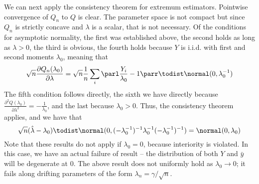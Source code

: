 \documentclass[10pt]{article}
\begin{document}
\begin{example}
	We can next apply the consistency theorem for extremum estimators. Pointwise convergence of $Q_n$ to $Q$ is clear. The parameter space is not compact but since $Q_n$ is strictly concave and $\lambda$ is a scalar, that is not necessary. Of the conditions for asymptotic normality, the first was established above, the second holds as long as $\lambda > 0$, the third is obvious, the fourth holds because $Y$ is i.i.d. with first and second moments $\lambda_0$, meaning that \[\sqrt{n}\frac{\partial Q_n(\lambda_0)}{\partial \lambda} = \sqrt{n}\frac{1}{n} \sum_i \parl \frac{Y_i}{\lambda_0}- 1\parr \todist \normal(0,\lambda_0^{-1})\]The fifth condition follows directly, the sixth we have directly because $\frac{\partial^2 Q(\lambda_0)}{\partial \lambda^2} = -\frac{1}{\lambda_0}$, and the last because $\lambda_0 > 0$. Thus, the consistency theorem applies, and we have that\[\sqrt{n}(\hat{\lambda}-\lambda_0) \todist \normal(0,(-\lambda_0^{-1})^{-1}\lambda_0^{-1} (-\lambda_0^{-1})^{-1}) = \normal(0,\lambda_0)\]Note that these results do not apply if $\lambda_0 = 0$, because interiority is violated. In this case, we have an actual failure of result -- the distribution of both $Y$ and $\bar{y}$ will be degenerate at 0. The above result does not uniformly hold as $\lambda_0 \to 0$; it fails along drifting parameters of the form $\lambda_n = \gamma / \sqrt{n}$. 
\end{example}
\end{document}
